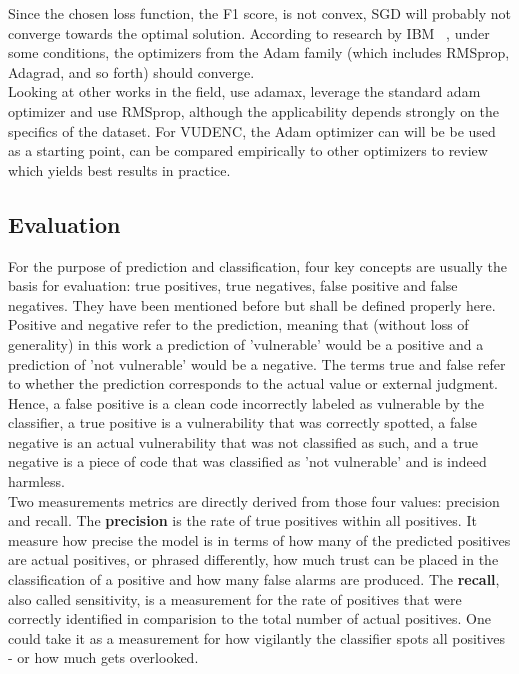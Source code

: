 \documentclass[
	a4paper,
	pagesize,
	pdftex,
	12pt,
	twoside, %
	BCOR=5mm, %
	ngerman,
	fleqn,
	final,
	]{scrartcl}
\begin{document}
Since the chosen loss function, the F1 score, is not convex, SGD will probably not converge towards the optimal solution. According to research by IBM ~\cite{IBMResearchEditorialStaff.6.5.2019}, under some conditions, the optimizers from the Adam family (which includes RMSprop, Adagrad, and so forth) should converge.\\
Looking at other works in the field, \cite{Li.2018} use adamax, \cite{Russell.2018} leverage the standard adam optimizer and \cite{Dam.2017} use RMSprop, although the applicability depends strongly on the specifics of the dataset. For VUDENC, the Adam optimizer can will be be used as a starting point, can be compared empirically to other optimizers to review which yields best results in practice.

\subsection{Evaluation}\label{Evaluation}
For the purpose of prediction and classification, four key concepts are usually the basis for evaluation: true positives, true negatives, false positive and false negatives. They have been mentioned before but shall be defined properly here. Positive and negative refer to the prediction, meaning that (without loss of generality) in this work a prediction of 'vulnerable' would be a positive and a prediction of 'not vulnerable' would be a negative. The terms true and false refer to whether the prediction corresponds to the actual value or external judgment. Hence, a false positive is a clean code incorrectly labeled as vulnerable by the classifier, a true positive is a vulnerability that was correctly spotted, a false negative is an actual vulnerability that was not classified as such, and a true negative is a piece of code that was classified as 'not vulnerable' and is indeed harmless.\\
Two measurements metrics are directly derived from those four values: precision and recall. The \textbf{precision} is the rate of true positives within all positives. It measure how precise the model is in terms of how many of the predicted positives are actual positives, or phrased differently, how much trust can be placed in the classification of a positive and how many false alarms are produced. The \textbf{recall}, also called sensitivity, is a measurement for the rate of positives that were correctly identified in comparision to the total number of actual positives. One could take it as a measurement for how vigilantly the classifier spots all positives - or how much gets overlooked.\newline
\end{document}
